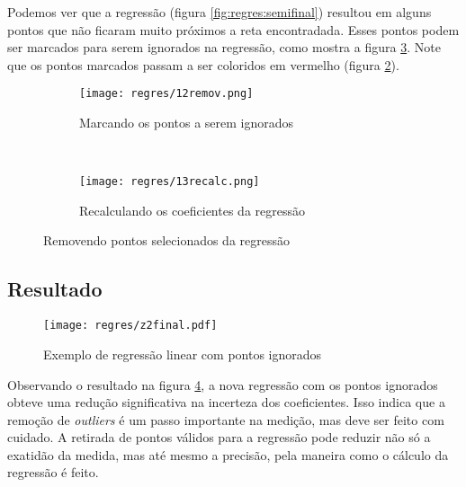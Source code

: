     Podemos ver que a regressão (figura \ref{fig:regres:semifinal}) resultou em alguns pontos que não ficaram muito próximos a reta encontradada. Esses pontos podem ser marcados para serem ignorados na regressão, como mostra a figura \ref{fig:regres:outliers}. Note que os pontos marcados passam a ser coloridos em vermelho (figura \ref{fig:regres:recalc}).

    \begin{figure}[htbp]
        \centering
        \begin{subfigure}{0.35\textwidth}
            \centering
            \texttt{[image: regres/12remov.png]}

            \caption{Marcando os pontos a serem ignorados}
            \label{fig:regres:mask}
        \end{subfigure}
        ~
        \begin{subfigure}{0.35\textwidth}
            \centering
            \texttt{[image: regres/13recalc.png]}

            \caption{Recalculando os coeficientes da regressão}
            \label{fig:regres:recalc}
        \end{subfigure}
        \caption{Removendo pontos selecionados da regressão}
        \label{fig:regres:outliers}
    \end{figure}


\subsection{Resultado}

    \begin{figure}[htbp]
        \centering
        \texttt{[image: regres/z2final.pdf]}

        \caption{Exemplo de regressão linear com pontos ignorados}
        \label{fig:regres:final}
    \end{figure}

    Observando o resultado na figura \ref{fig:regres:final}, a nova regressão com os pontos ignorados obteve uma redução significativa na incerteza dos coeficientes. Isso indica que a remoção de \textit{outliers} é um passo importante na medição, mas deve ser feito com cuidado. A retirada de pontos válidos para a regressão pode reduzir não só a exatidão da medida, mas até mesmo a precisão, pela maneira como o cálculo da regressão é feito.
